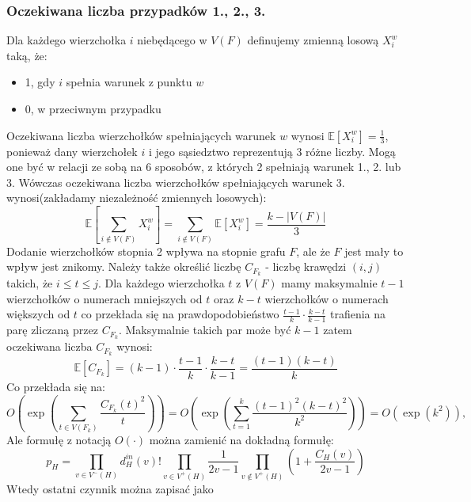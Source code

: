 \documentclass{article}
\begin{document}
\subsubsection{Oczekiwana liczba przypadków 1., 2., 3.}
Dla każdego wierzchołka $i$ niebędącego w $V(F)$ definujemy zmienną losową $X^w_i$ taką, że:
\begin{itemize}
  \item 1, gdy $i$ spełnia warunek z punktu $w$
  \item 0, w przeciwnym przypadku
\end{itemize}
Oczekiwana liczba wierzchołków spełniających warunek $w$ wynosi $\mathbb{E}[X^w_i] = \frac{1}{3}$, ponieważ dany wierzchołek $i$ i jego sąsiedztwo reprezentują 3 różne liczby. 
Mogą one być w relacji ze sobą na 6 sposobów, z których 2 spełniają warunek 1., 2. lub 3.
Wówczas oczekiwana liczba wierzchołków spełniających warunek 3. wynosi(zakładamy niezależność zmiennych losowych):
\begin{dmath}
  \mathbb{E}[\sum_{i \notin V(F)} X^w_i] = \sum_{i \notin V(F)} \mathbb{E}[X^w_i] = \frac{k-|V(F)|}{3}
\end{dmath}
Dodanie wierzchołków stopnia 2 wpływa na stopnie grafu $F$, ale że $F$ jest mały to wpływ jest znikomy.
\newline \newline
Należy także określić liczbę $C_{F_k}$ - liczbę krawędzi $(i,j)$ takich, że $i \leq t \leq j$.
Dla każdego wierzchołka $t$ z $V(F)$ mamy maksymalnie $t-1$ wierzchołków o numerach mniejszych od $t$ oraz $k-t$ wierzchołków o numerach większych od $t$
co przekłada się na prawdopodobieństwo $\frac{t-1}{k} \cdot \frac{k-t}{k-1}$ trafienia na parę zliczaną przez $C_{F_k}$.
Maksymalnie takich par może być $k-1$ zatem oczekiwana liczba $C_{F_k}$ wynosi:
\begin{dmath}
  \mathbb{E}[C_{F_k}] = (k-1) \cdot \frac{t-1}{k} \cdot \frac{k-t}{k-1} = \frac{(t-1)(k-t)}{k}
\end{dmath}
Co przekłada się na:
\begin{dmath}
  O(\exp(\sum_{t \in V(F_k)}\frac{C_{F_k}(t)^2}{t})) = O(\exp(\sum_{t=1}^{k} \frac{(t-1)^2(k-t)^2}{k^2})) = O(\exp(k^2)),
\end{dmath}
Ale formułę z notacją $O(\cdot)$ można zamienić na dokładną formułę:
\begin{dmath}
  p_H = \prod_{v \in V^{-}(H)} d_{H}^{in}(v)! \prod_{v \in V^{+}(H)} \frac{1}{2v - 1} \prod_{v \notin V^{+}(H)} (1 + \frac{C_{H}(v)}{2v-1})
\end{dmath}
Wtedy ostatni czynnik można zapisać jako 
\end{document}
